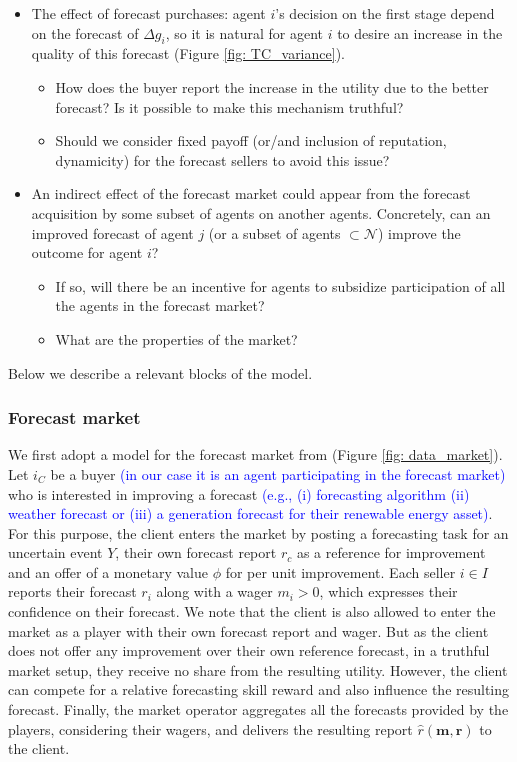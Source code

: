 \documentclass{article}
\newcommand{\tcb}{\textcolor{blue}}
\begin{document}
\begin{itemize}
    \item The effect of forecast purchases: agent $i$'s decision on the first stage depend on the forecast of $\Delta g_i$, so it is natural for agent $i$ to desire an increase in the quality of this forecast (Figure \ref{fig: TC_variance}).
    \begin{itemize}
        \item How does the buyer report the increase in the utility due to the better forecast? Is it possible to make this mechanism truthful? 
        
        \item Should we consider fixed payoff (or/and inclusion of reputation, dynamicity) for the forecast sellers to avoid this issue?
    \end{itemize}
    
    \item An indirect effect of the forecast market could appear from the forecast acquisition by some subset of agents on another agents. Concretely, can an improved forecast of agent $j$ (or a subset of agents $\subset \mathcal{N}$) improve the outcome for agent $i$?
    \begin{itemize}
        \item If so, will there be an incentive for agents to subsidize participation of all the agents in the forecast market? 
        
        \item What are the properties of the market?
    \end{itemize}
\end{itemize}

Below we describe a relevant blocks of the model.

\subsubsection{Forecast market}
We first adopt a model for the forecast market from \cite{raja} (Figure \ref{fig: data_market}). Let $i_C$ be a buyer \tcb{(in our case it is an agent participating in the forecast market)} who is interested in improving a forecast \tcb{(e.g., (i) forecasting algorithm (ii) weather forecast or (iii) a generation forecast for their renewable energy asset)}. For this purpose, the client enters the market by posting a forecasting task for an uncertain event $Y$, their own forecast report $r_c$ as a reference for improvement and an offer of a monetary value $\phi$ for per unit improvement.  Each seller $i \in I$ reports their forecast $r_i$ along with a wager $m_i >0$, which expresses their confidence on their forecast. We note that the client is also allowed to enter the market as a player with their own forecast report and wager. But as the client does not offer any improvement over their own reference forecast, in a truthful market setup, they receive no share from the resulting utility. However, the client can compete for a relative forecasting skill reward and also influence the resulting forecast. Finally, the market operator aggregates all the forecasts provided by the players, considering their wagers, and delivers the resulting report $\hat{r}(\mathbf{m}, \mathbf{r})$ to the client. 
\end{document}
